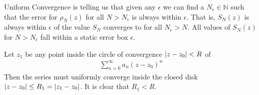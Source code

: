 \documentclass[12pt, english]{book}
\begin{document}
	Uniform Convergence is telling us that given any \(\epsilon\) we can find a \(N_\epsilon \in \mathbb{N}\) such that the error for \(\rho_N(z)\) for all \(N > N_\epsilon\) is always within \(\epsilon\). That is, \(S_N(z)\) is always within \(\epsilon\) of the value \(S_N\) converges to for all \(N_\epsilon > N\). All values of \(S_N(z)\) for \(N > N_\epsilon\) fall within a static error box \(\epsilon\).

	\begin{theorem}
		\label{Local Uniform Convergence of Power Series Theorem - Complex}
		Let \(z_1\) be any point inside the circle of convergence \(\abs{z-z_0}<R\) of 
		\begin{align*}
			\sum_{n=0}^{\infty} a_n (z-z_0)^n
		\end{align*}
		Then the series must uniformly converge inside the closed disk \(\abs{z-z_0}\leq R_1 = \abs{z_1 - z_0}\). It is clear that \(R_1 < R\).
	\end{theorem}

	\begin{figure}[H]
		\centering
	\end{figure}
	
\end{document}
